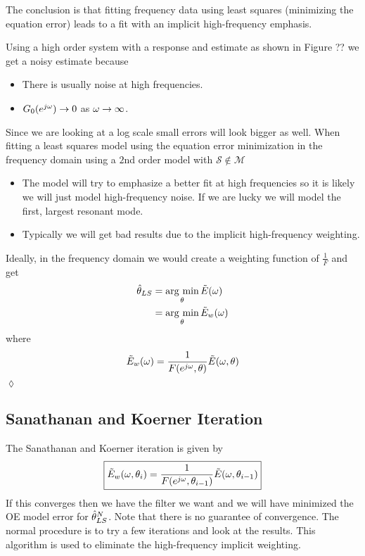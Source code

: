 The conclusion is that fitting frequency data using least squares (minimizing the equation error) leads to a fit with an implicit high-frequency emphasis.

\begin{example}
Using a high order system with a response and estimate as shown in Figure ?? we get a noisy estimate because
\begin{itemize}
\item There is usually noise at high frequencies.
\item $G_0(e^{j\omega})\to0$ as $\omega\to\infty$.
\end{itemize}
Since we are looking at a log scale small errors will look bigger as well. When fitting a least squares model using the equation error minimization in the frequency domain using a $2$nd order model with $\mathcal{S}\notin\mathcal{M}$
\begin{itemize}
\item The model will try to emphasize a better fit at high frequencies so it is likely we will just model high-frequency noise. If we are lucky we will model the first, largest resonant mode.
\item Typically we will get bad results due to the implicit high-frequency weighting.
\end{itemize}
Ideally, in the frequency domain we would create a weighting function of $\tfrac{1}{F}$ and get
\begin{align*}
\hat{\theta}_{LS} &= \mathop{\arg\,\min}\limits_\theta\tilde{E}(\omega) \\
&= \mathop{\arg\,\min}\limits_\theta\tilde{E}_w(\omega)
\end{align*}
where
$$\tilde{E}_w(\omega) = \frac{1}{F(e^{j\omega},\theta)}\tilde{E}(\omega,\theta)$$
$\lozenge$
\end{example}

\subsection{Sanathanan and Koerner Iteration}
The Sanathanan and Koerner iteration is given by
\begin{align*}
\boxed{\tilde{E}_w(\omega,\theta_i) = \frac{1}{F(e^{j\omega},\theta_{i-1})}\tilde{E}(\omega,\theta_{i-1})}
\end{align*}
If this converges then we have the filter we want and we will have minimized the OE model error for $\hat{\theta}_{LS}^N$. Note that there is no guarantee of convergence. The normal procedure is to try a few iterations and look at the results. This algorithm is used to eliminate the high-frequency implicit weighting.

